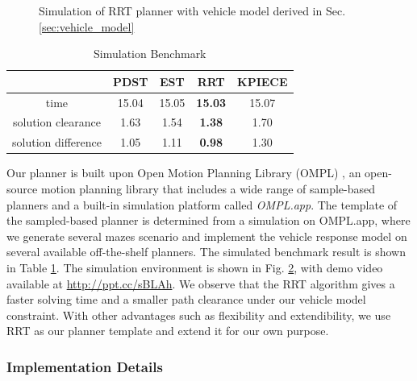 \documentclass[../thesis.tex]{subfiles}
\begin{document}
\begin{figure}[t]
\begin{subfigure}[b]{0.3\linewidth}
           	\subcaption{}
           	\label{fig:rrt-sim-maze2}
    	\end{subfigure}
    	\caption{Simulation of RRT planner with vehicle model derived in Sec. \ref{sec:vehicle_model}}
	\label{fig:rrt-sim-maze}
\end{figure}
 
 
\begin{table}[t]
    	\centering
    	\caption{Simulation Benchmark}
    	\label{table:simulation-benchmark}
    	\begin{small}
    	\begin{sc}
    	\begin{tabular}{ccccc}
           	\toprule
                   	& PDST \cite{ladd2005motion} & EST \cite{hsu1997path} & RRT \cite{kuffner2000rrt} & KPIECE \cite{csucan2009kinodynamic} \\
           	\midrule \midrule
           	time & 15.04 & 15.05 & \textbf{15.03} & 15.07 \\
           	solution clearance & 1.63 & 1.54 & \textbf{1.38} & 1.70 \\
           	solution difference & 1.05 & 1.11 & \textbf{0.98} & 1.30 \\
           	\toprule
    	\end{tabular}
    	\end{sc}
    	\end{small}
\end{table}
 
Our planner is built upon Open Motion Planning Library (OMPL) \cite{sucan2012the-open-motion-planning-library}, an open-source motion planning library that includes a wide range of sample-based planners and a built-in simulation platform called \textit{OMPL.app}.
The template of the sampled-based planner is determined from a simulation on OMPL.app, where we generate several mazes scenario and implement the vehicle response model on several available off-the-shelf planners. The simulated benchmark result is shown in Table \ref{table:simulation-benchmark}. The simulation environment is shown in Fig. \ref{fig:rrt-sim-maze}, with demo video available at \url{http://ppt.cc/sBLAh}. We observe that the RRT algorithm gives a faster solving time and a smaller path clearance under our vehicle model constraint. With other advantages such as flexibility and extendibility, we use RRT as our planner template and extend it for our own purpose.
 
 
\subsubsection{Implementation Details}
 
\end{document}

